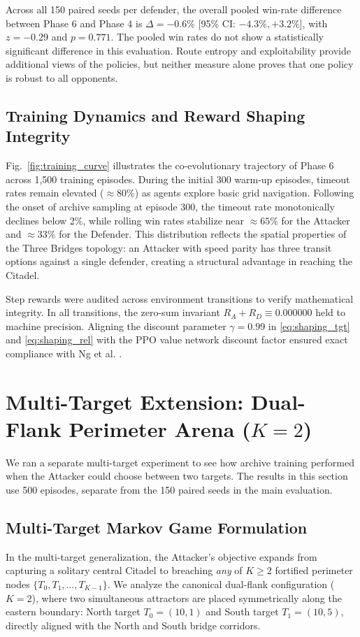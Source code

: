 \documentclass[conference]{IEEEtran}
\begin{document}
Across all 150 paired seeds per defender, the overall pooled win-rate difference between Phase 6 and Phase 4 is $\Delta = -0.6\%$ [95\% CI: $-4.3\%, +3.2\%$], with $z = -0.29$ and $p = 0.771$. The pooled win rates do not show a statistically significant difference in this evaluation. Route entropy and exploitability provide additional views of the policies, but neither measure alone proves that one policy is robust to all opponents.

\subsection{Training Dynamics and Reward Shaping Integrity}
Fig.~\ref{fig:training_curve} illustrates the co-evolutionary trajectory of Phase 6 across 1,500 training episodes. During the initial 300 warm-up episodes, timeout rates remain elevated ($\approx 80\%$) as agents explore basic grid navigation. Following the onset of archive sampling at episode 300, the timeout rate monotonically declines below 2\%, while rolling win rates stabilize near $\approx 65\%$ for the Attacker and $\approx 33\%$ for the Defender. This distribution reflects the spatial properties of the Three Bridges topology: an Attacker with speed parity has three transit options against a single defender, creating a structural advantage in reaching the Citadel.

Step rewards were audited across environment transitions to verify mathematical integrity. In all transitions, the zero-sum invariant $R_A + R_D \equiv 0.000000$ held to machine precision. Aligning the discount parameter $\gamma = 0.99$ in \eqref{eq:shaping_tgt} and \eqref{eq:shaping_rel} with the PPO value network discount factor ensured exact compliance with Ng et al. \cite{ng1999policy}.

\section{Multi-Target Extension: Dual-Flank Perimeter Arena ($K=2$)}
\label{sec:multi_target}

We ran a separate multi-target experiment to see how archive training performed when the Attacker could choose between two targets. The results in this section use 500 episodes, separate from the 150 paired seeds in the main evaluation.

\subsection{Multi-Target Markov Game Formulation}
In the multi-target generalization, the Attacker's objective expands from capturing a solitary central Citadel to breaching \textit{any} of $K \ge 2$ fortified perimeter nodes $\{T_0, T_1, \dots, T_{K-1}\}$. We analyze the canonical dual-flank configuration ($K=2$), where two simultaneous attractors are placed symmetrically along the eastern boundary: North target $T_0 = (10, 1)$ and South target $T_1 = (10, 5)$, directly aligned with the North and South bridge corridors.
\end{document}
